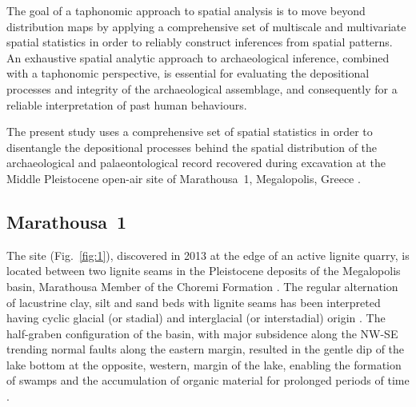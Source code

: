 \documentclass[preprint,authoryear,times]{elsarticle} %
\begin{document}
The goal of a taphonomic approach to spatial analysis is to move beyond distribution maps by applying a comprehensive set of multiscale and multivariate spatial statistics in order to reliably construct inferences from spatial patterns. An exhaustive spatial analytic approach to archaeological inference, combined with a taphonomic perspective, is essential for evaluating the depositional processes and integrity of the archaeological assemblage, and consequently for a reliable interpretation of past human behaviours.

The present study uses a comprehensive set of spatial statistics in order to disentangle the depositional processes behind the spatial distribution of the archaeological and palaeontological record recovered during excavation at the Middle Pleistocene open-air site of Marathousa~1, Megalopolis, Greece \citep{Panagopoulou2015,Harvati2016}.


\subsection{Marathousa~1}

The site (Fig.~\ref{fig:1}), discovered in 2013 at the edge of an active lignite quarry, is located between two lignite seams in the Pleistocene deposits of the Megalopolis basin, Marathousa Member of the Choremi Formation \citep{Vugt2000}. The regular alternation of lacustrine clay, silt and sand beds with lignite seams has been interpreted having cyclic glacial (or stadial) and interglacial (or interstadial) origin \citep{Nickel1996}. The half-graben configuration of the basin, with major subsidence along the NW-SE trending normal faults along the eastern margin, resulted in the gentle dip of the lake bottom at the opposite, western, margin of the lake, enabling the formation of swamps and the accumulation of organic material for prolonged periods of time \citep{Vugt2000}.
\end{document}
